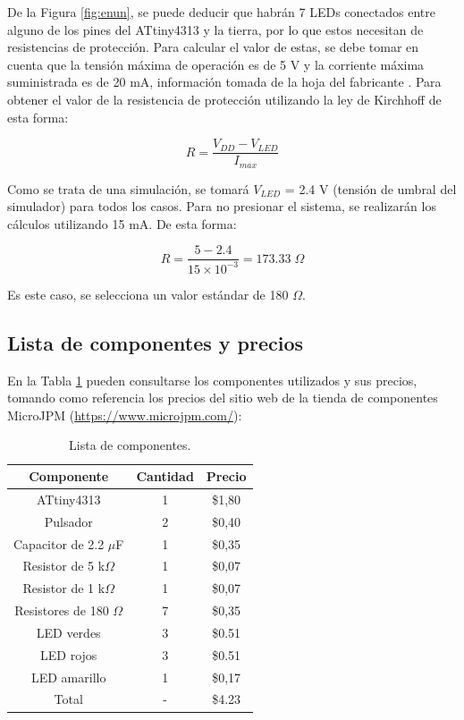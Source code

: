 De la Figura \ref{fig:enun}, se puede deducir que habrán 7 LEDs conectados entre alguno de los pines del ATtiny4313 y la tierra, por lo que estos necesitan de resistencias de protección. Para calcular el valor de estas, se debe tomar en cuenta que la tensión máxima de operación es de 5 V y la corriente máxima suministrada es de 20 mA, información tomada de la hoja del fabricante \cite{AT}. Para obtener el valor de la resistencia de protección utilizando la ley de Kirchhoff de esta forma:

\begin{equation}
    R = \frac{V_{DD} - V_{LED}}{I_{max}} 
\end{equation}

Como se trata de una simulación, se tomará $V_{LED}$ = 2.4 V (tensión de umbral del simulador) para todos los casos. Para no presionar el sistema, se realizarán los cálculos utilizando 15 mA. De esta forma: 

\begin{equation}
    R = \frac{5 - 2.4}{15 \times 10^{-3}} = 173.33 \; \Omega
\end{equation}

\noindent Es este caso, se selecciona un valor estándar de 180 $\Omega$. 

\subsection{Lista de componentes y precios}

En la Tabla \ref{table:Equipo} pueden consultarse los componentes utilizados y sus precios, tomando como referencia los precios del sitio web de la tienda de componentes MicroJPM (\url{https://www.microjpm.com/}): 

\begin{table}[H]
\caption{Lista de componentes.}
\begin{center}
\begin{tabular}{c|c|c}
\hline
\textbf{Componente}&\textbf{Cantidad}&\textbf{Precio}\\
\hline
ATtiny4313 & 1 & \$1,80\\
Pulsador & 2 & \$0,40\\
Capacitor de 2.2 $\mu$F & 1 & \$0,35\\
Resistor de 5 k$\Omega$ & 1 & \$0,07\\
Resistor de 1 k$\Omega$ & 1 & \$0,07\\
Resistores de 180 $\Omega$ & 7 & \$0,35\\
LED verdes & 3 & \$0.51\\ 
LED rojos & 3 & \$0.51\\ 
LED amarillo & 1 & \$0,17\\ 
\hline
Total & - & \$4.23\\
\end{tabular} \label{table:Equipo}
\end{center}
\end{table}

